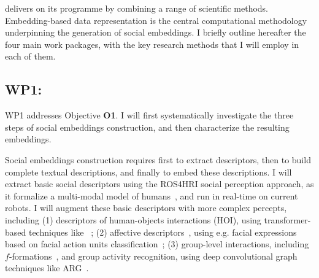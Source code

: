 \project delivers on its programme by combining a range of scientific methods.
Embedding-based data representation is the central computational methodology
underpinning the generation of social embeddings.  I briefly outline hereafter
the four main work packages, with the key research methods that I will employ in
each of them.








\subsection{WP1: \textbf{\WPA}}

WP1 addresses Objective \textbf{O1}. I will first systematically investigate the
three steps of social embeddings construction, and then characterize the
resulting embeddings.

Social embeddings construction requires first to extract descriptors, then to
build complete textual descriptions, and finally to embed these descriptions.  I
will extract basic social descriptors using the ROS4HRI social perception
approach, as it formalize a multi-modal model of humans~\cite{lemaignan2022ros},
and run in real-time on current robots. I will augment these basic descriptors
with more complex percepts, including (1) descriptors of human-objects
interactions (HOI), using transformer-based techniques
like~\cite{iftekhar2022what} ; (2) affective
descriptors~\cite{vinciarelli2009social}, using e.g. facial expressions based on
facial action units classification~\cite{martinez2019automatic}; (3) group-level
interactions, including $f$-formations~\cite{setti2015fformation}, and group
activity recognition, using deep convolutional graph techniques like
ARG~\cite{wu2019learning}.

